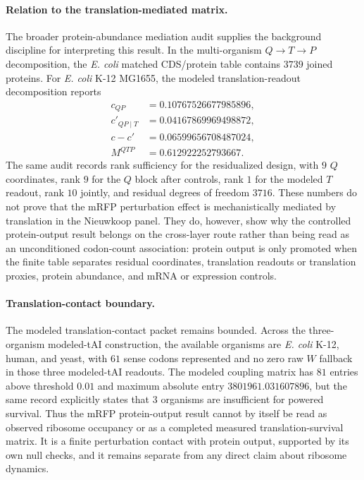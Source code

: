 \paragraph{Relation to the translation-mediated matrix.}
The broader protein-abundance mediation audit supplies the background discipline for interpreting this result.  In the multi-organism $Q\to T\to P$ decomposition, the \textit{E. coli} matched CDS/protein table contains $3739$ joined proteins.  For \textit{E. coli} K-12 MG1655, the modeled translation-readout decomposition reports
$$
\begin{aligned}
c_{QP} &= 0.10767526677985896,\\
c'_{QP\mid T} &= 0.04167869969498872,\\
c-c' &= 0.06599656708487024,\\
M^{QTP} &= 0.612922252793667.
\end{aligned}
$$
The same audit records rank sufficiency for the residualized design, with $9$ $Q$ coordinates, rank $9$ for the $Q$ block after controls, rank $1$ for the modeled $T$ readout, rank $10$ jointly, and residual degrees of freedom $3716$.  These numbers do not prove that the mRFP perturbation effect is mechanistically mediated by translation in the Nieuwkoop panel.  They do, however, show why the controlled protein-output result belongs on the cross-layer route rather than being read as an unconditioned codon-count association: protein output is only promoted when the finite table separates residual coordinates, translation readouts or translation proxies, protein abundance, and mRNA or expression controls.

\paragraph{Translation-contact boundary.}
The modeled translation-contact packet remains bounded.  Across the three-organism modeled-tAI construction, the available organisms are \textit{E. coli} K-12, human, and yeast, with $61$ sense codons represented and no zero raw $W$ fallback in those three modeled-tAI readouts.  The modeled coupling matrix has $81$ entries above threshold $0.01$ and maximum absolute entry $3801961.031607896$, but the same record explicitly states that $3$ organisms are insufficient for powered survival.  Thus the mRFP protein-output result cannot by itself be read as observed ribosome occupancy or as a completed measured translation-survival matrix.  It is a finite perturbation contact with protein output, supported by its own null checks, and it remains separate from any direct claim about ribosome dynamics.

